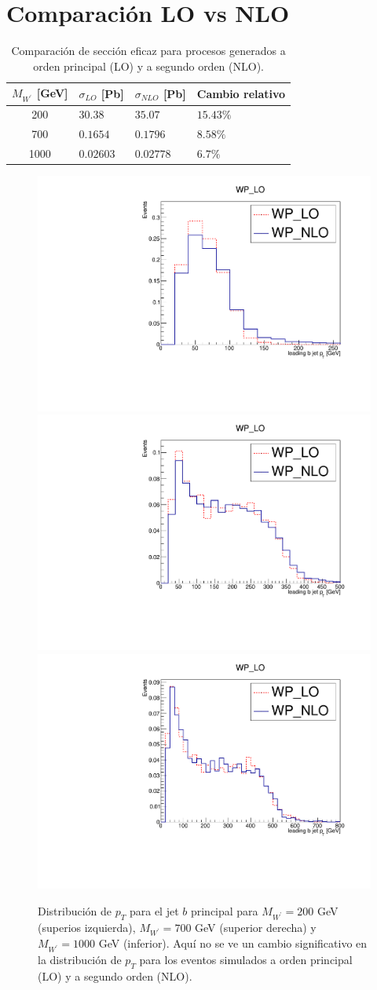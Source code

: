 \chapter{Comparación LO vs NLO}\label{LOvsNLO}

\begin{table}[htbp]
\begin{center}
\begin{tabular}{clll}\hline
$M_{W^{\prime}}$ [GeV] &               $\sigma_{LO}$ [Pb] &             $\sigma_{NLO}$ [Pb] & Cambio relativo \\\hline
200  &   $30.38$ &    $35.07 $ &    $15.43\%$ \\
700 &    $0.1654$ &   $0.1796 $ &   $8.58\%$ \\
1000 &   $0.02603$ &  $0.02778 $ &  $6.7\%$ \\\hline
\end{tabular}
\caption {Comparación de sección eficaz para procesos generados a orden principal (LO) y a segundo orden (NLO).}
\label{tab:cutefficiencynw}
\end{center}
\end{table}
%


%
\begin{figure}
\begin{center}
\includegraphics[width = 0.45 \textwidth]{figures/leading_jet_p_T_200_Norm.pdf}
\includegraphics[width = 0.45 \textwidth]{figures/leading_jet_p_T_700_Norm.pdf}
\includegraphics[width = 0.45 \textwidth]{figures/leading_jet_p_T_1000_Norm.pdf}
\caption{Distribución de $p_{T}$ para el jet $b$ principal para $M_{W^{\prime}} = 200$ GeV (superios izquierda), $M_{W^{\prime}} = 700$ GeV (superior derecha) y $M_{W^{\prime}} = 1000$ GeV (inferior). Aquí no se ve un cambio significativo en la distribución de $p_{T}$ para los eventos simulados a orden principal (LO) y a segundo orden (NLO).  }
\label{Fig:DisCine}
\end{center}
\end{figure}
%